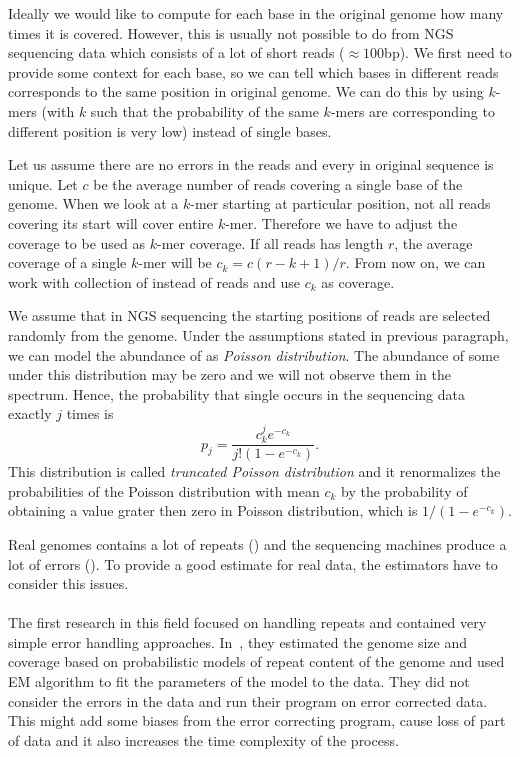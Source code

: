 Ideally we would like to compute for each base in the original genome how many times it is covered. However, this is usually not possible to do from NGS sequencing data which consists of a lot of short reads ($\approx 100$bp). We first need to provide some context for each base, so we can tell which bases in different reads corresponds to the same position in original genome. We can do this by using $k$-mers (with $k$ such that the probability of the same $k$-mers are corresponding to different position is very low)  instead of single bases.

Let us assume there are no errors in the reads and every \kmer in original sequence is unique. Let $c$ be the average number of reads covering a single base of the genome. When we look at a $k$-mer starting at particular position, not all reads covering its start will cover entire $k$-mer. Therefore we have to adjust the coverage to be used as $k$-mer coverage. If all reads has length $r$, the average coverage of a single $k$-mer will be $c_k = c (r - k + 1)/r$. From now on, we can work with collection of \kmers instead of reads and use $c_k$ as coverage.

We assume that in NGS sequencing the starting positions of reads are selected randomly from the genome.
Under the assumptions stated in previous paragraph, we can model the abundance of \kmers as \emph{Poisson distribution}. The abundance of some \kmers under this distribution may be zero and we will not observe them in the spectrum. Hence, the probability that single \kmer occurs in the sequencing data exactly $j$ times is $$p_j = \frac{c_k^j e^{-c_k}}{j! (1-e^{-c_k})}.$$
This distribution is called \emph{truncated Poisson distribution} and it renormalizes the probabilities of the Poisson distribution with mean $c_k$ by the probability of obtaining a value grater then zero in Poisson distribution, which is $1/(1-e^{-c_k})$.

Real genomes contains a lot of repeats () and the sequencing machines produce a lot of errors (). To provide a good estimate for real data, the estimators have to consider this issues.

\paragraph{} The first research in this field focused on handling repeats and contained very simple error handling approaches. In~\cite{waterman}, they estimated the genome size and coverage based on probabilistic models of repeat content of the genome and used EM algorithm to fit the parameters of the model to the data. They did not consider the errors in the data and run their program on error corrected data. This might add some biases from the error correcting program, cause loss of part of data and it also increases the time complexity of the process.

